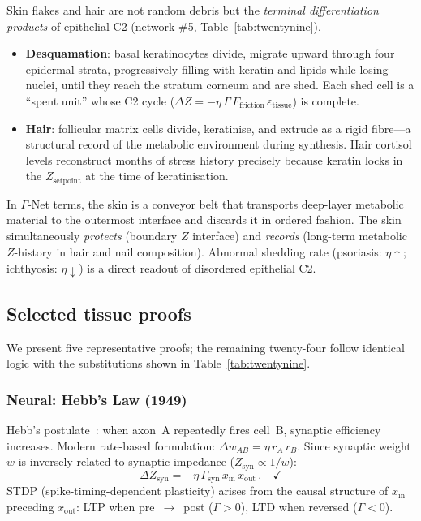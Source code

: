 \documentclass[aps,pre,twocolumn,superscriptaddress,floatfix]{revtex4-2}
\begin{document}
\begin{remark}
\label{rem:skin-hair-excretion}
Skin flakes and hair are not random debris but the
\emph{terminal differentiation products} of epithelial
C2 (network \#5, Table~\ref{tab:twentynine}).
\begin{itemize}
  \item \textbf{Desquamation}: basal keratinocytes
    divide, migrate upward through four epidermal
    strata, progressively filling with keratin and
    lipids while losing nuclei, until they reach the
    stratum corneum and are shed.
    Each shed cell is a ``spent unit'' whose C2 cycle
    ($\Delta Z = -\eta\,\Gamma\,F_{\text{friction}}\,
    \varepsilon_{\text{tissue}}$) is complete.
  \item \textbf{Hair}: follicular matrix cells
    divide, keratinise, and extrude as a rigid
    fibre---a structural record of the metabolic
    environment during synthesis.
    Hair cortisol levels reconstruct months of
    stress history precisely because keratin locks in
    the $Z_{\text{setpoint}}$ at the time of
    keratinisation.
\end{itemize}
In $\Gamma$-Net terms, the skin is a conveyor belt
that transports deep-layer metabolic material to the
outermost interface and discards it in ordered fashion.
The skin simultaneously \emph{protects} (boundary $Z$
interface) and \emph{records} (long-term metabolic
$Z$-history in hair and nail composition).
Abnormal shedding rate (psoriasis: $\eta \uparrow$;
ichthyosis: $\eta \downarrow$) is a direct readout of
disordered epithelial C2.
\end{remark}

\subsection{Selected tissue proofs}
\label{sec:tissue-proofs}

We present five representative proofs; the remaining
twenty-four follow identical logic with the substitutions
shown in Table~\ref{tab:twentynine}.

\subsubsection{Neural: Hebb's Law (1949)}

Hebb's postulate~\cite{Hebb1949}: when axon~A repeatedly
fires cell~B, synaptic efficiency increases.
Modern rate-based formulation:
$\Delta w_{AB} = \eta\,r_A\,r_B$.
Since synaptic weight $w$ is inversely related to
synaptic impedance ($Z_{\text{syn}} \propto 1/w$):
\begin{equation}
  \Delta Z_{\text{syn}}
  = -\eta\,\Gamma_{\text{syn}}\,
    x_{\text{in}}\,x_{\text{out}}\,.
  \quad \checkmark
  \label{eq:hebb-C2}
\end{equation}
STDP (spike-timing-dependent plasticity) arises from
the causal structure of $x_{\text{in}}$ preceding
$x_{\text{out}}$: LTP when pre~$\to$~post ($\Gamma > 0$),
LTD when reversed ($\Gamma < 0$).
\end{document}
